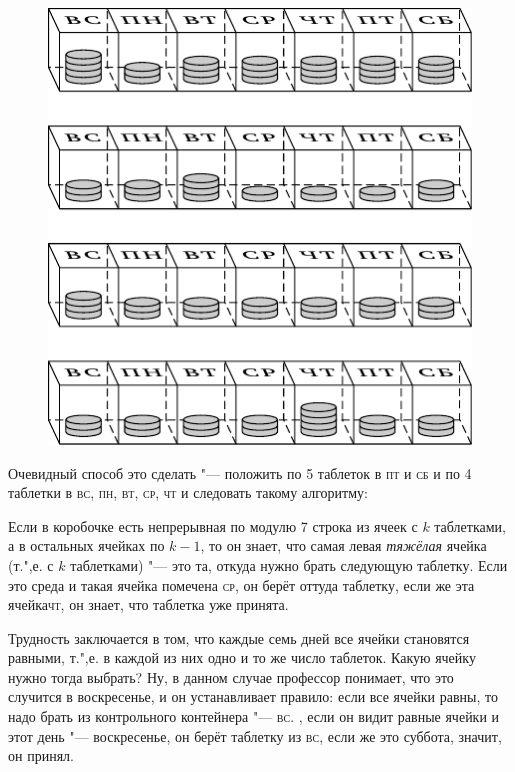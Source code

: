 \documentclass[twoside]{book}
\begin{document}
\begin{figure}[!ht]
\centering
\includegraphics{mp/wink-25}
\end{figure}


Очевидный способ это сделать "--- положить по 5 таблеток в \textsc{пт} и \textsc{сб} и по 4 таблетки в \textsc{вс}, \textsc{пн}, \textsc{вт}, \textsc{ср}, \textsc{чт} и следовать такому алгоритму:

\medskip
 Если в коробочке есть непрерывная по модулю 7 строка из ячеек с $k$ таблетками, а в остальных ячейках по $k-1$, то он знает, что самая левая \emph{тяжёлая} ячейка (т.",е. с $k$ таблетками) "--- это та, откуда нужно брать следующую таблетку.
Если это среда и такая ячейка помечена \textsc{ср}, он берёт оттуда таблетку, если же эта ячейка\textsc{чт}, он знает, что таблетка уже принята.

\medskip
Трудность заключается в том, что каждые семь дней все ячейки становятся равными, т.",е. в каждой из них одно и то же число таблеток.
Какую ячейку нужно тогда выбрать?
Ну, в данном случае профессор понимает, что это случится в воскресенье, и он устанавливает правило: если все ячейки равны, то надо брать из контрольного контейнера "--- \textsc{вс}.
, если он видит равные ячейки и этот день "--- воскресенье,  он берёт таблетку из \textsc{вс}, если же это суббота, значит, он  принял.
\end{document}
